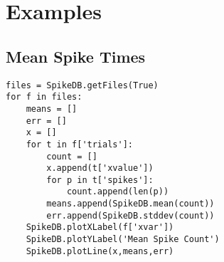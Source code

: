\documentclass{report}
\begin{document}
\subsection{}
\subsection{}
\subsection{}
\subsection{}
\subsection{}
\subsection{}
\subsection{}

\section{Examples}
\subsection{Mean Spike Times}
\begin{lstlisting}[label=codeMean,caption=Calculating the mean spike counts.]
files = SpikeDB.getFiles(True)
for f in files:
	means = []
	err = []
	x = []
	for t in f['trials']:
		count = []
		x.append(t['xvalue'])	
		for p in t['spikes']:
			count.append(len(p))
		means.append(SpikeDB.mean(count))
		err.append(SpikeDB.stddev(count))
	SpikeDB.plotXLabel(f['xvar'])
	SpikeDB.plotYLabel('Mean Spike Count')
	SpikeDB.plotLine(x,means,err)
\end{lstlisting}
\end{document}
